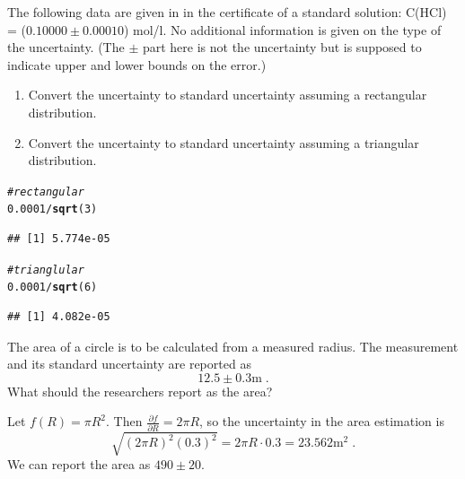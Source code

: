 \documentclass[twoside]{book}\usepackage[]{graphicx}\usepackage[]{xcolor}
\makeatletter
\newcommand{\hlnum}[1]{\textcolor[rgb]{0.686,0.059,0.569}{#1}}%
\newcommand{\hlcom}[1]{\textcolor[rgb]{0.678,0.584,0.686}{\textit{#1}}}%
\newcommand{\hlopt}[1]{\textcolor[rgb]{0,0,0}{#1}}%
\newcommand{\hlstd}[1]{\textcolor[rgb]{0.345,0.345,0.345}{#1}}%
\newcommand{\hlkwd}[1]{\textcolor[rgb]{0.737,0.353,0.396}{\textbf{#1}}}%
\newenvironment{kframe}{%
 \def\at@end@of@kframe{}%
 \ifinner\ifhmode%
  \def\at@end@of@kframe{\end{minipage}}%
  \begin{minipage}{\columnwidth}%
 \fi\fi%
 \def\FrameCommand##1{\hskip\@totalleftmargin \hskip-\fboxsep
 \colorbox{shadecolor}{##1}\hskip-\fboxsep
     \hskip-\linewidth \hskip-\@totalleftmargin \hskip\columnwidth}%
 \MakeFramed {\advance\hsize-\width
   \@totalleftmargin\z@ \linewidth\hsize
   \@setminipage}}%
 {\par\unskip\endMakeFramed%
 \at@end@of@kframe}
\newenvironment{knitrout}{}{} %
\newcommand{\Partial}[2]{\frac{\partial #1}{\partial #2}}
\makeatother
\begin{document}
\begin{problem}
The following data are given in in the certificate of a standard solution: 
C(HCl) = ($0.10000 \pm 0.00010$) mol/l. 
No additional information is given on the type of the uncertainty. 
(The $\pm$ part here is not the uncertainty but is supposed to indicate
upper and lower bounds on  the error.)
\begin{enumerate}
\item
Convert the uncertainty to standard uncertainty assuming a
rectangular distribution.
\item
Convert the uncertainty to standard uncertainty assuming a
triangular distribution.
\end{enumerate}
\end{problem}

\begin{solution}
\begin{knitrout}
\color{fgcolor}\begin{kframe}
\begin{alltt}
\hlcom{# rectangular}
\hlnum{0.0001} \hlopt{/} \hlkwd{sqrt}\hlstd{(}\hlnum{3}\hlstd{)}
\end{alltt}
\begin{verbatim}
## [1] 5.774e-05
\end{verbatim}
\begin{alltt}
\hlcom{# trianglular}
\hlnum{0.0001} \hlopt{/} \hlkwd{sqrt}\hlstd{(}\hlnum{6}\hlstd{)}
\end{alltt}
\begin{verbatim}
## [1] 4.082e-05
\end{verbatim}
\end{kframe}
\end{knitrout}
\end{solution}

\begin{problem}
The area of a circle is to be calculated from a measured radius.  The measurement and its
standard uncertainty are reported as 
\[
12.5 \pm 0.3 \mbox{m} \;.
\]
What should the researchers report as the area?
\end{problem}

\begin{solution}
Let $f(R) = \pi R^2$.  Then $\Partial{f}{R} = 2\pi R$, so the uncertainty in the area estimation
is 
\[
\sqrt{ (2 \pi R)^2 (0.3)^2 } = 2 \pi R \cdot 0.3  = 23.562 
\mathrm{m}^2
\;.
\]
We can report the area as 
$490 \pm 20$.
\end{solution}
\end{document}
